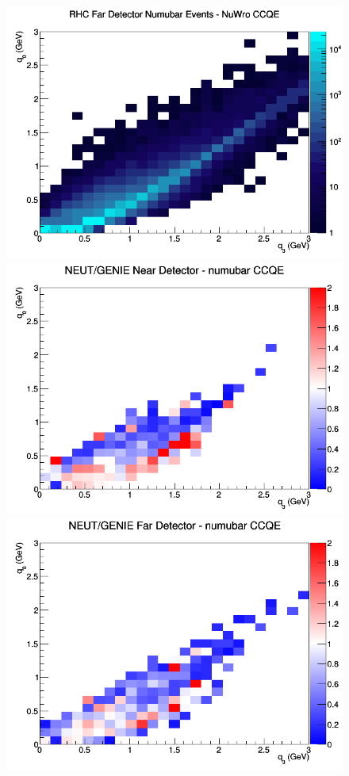 \documentclass[12pt]{article}
\begin{document}
\begin{figure}[h]
\endminipage
{}
\includegraphics[width=\linewidth]{eff_q0_q3/FGT/CCQE_RHC_FD_numubar_q3_q0_NuWro.png}
\endminipage
\newline
{}
\includegraphics[width=\linewidth]{eff_q0_q3/FGT/ratios/CCQE_NEUT_GENIE_numubar_near_q3_q0.png}
\endminipage
{}
\includegraphics[width=\linewidth]{eff_q0_q3/FGT/ratios/CCQE_NEUT_GENIE_numubar_far_q3_q0.png}

\end{figure}
\end{document}
